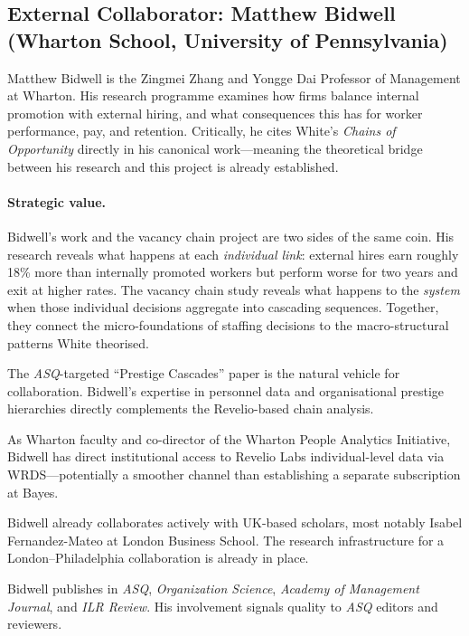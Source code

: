 \documentclass[a4paper]{tufte-handout}
\begin{document}
\subsection{External Collaborator: Matthew Bidwell (Wharton School, University of Pennsylvania)}


Matthew Bidwell is the Zingmei Zhang and Yongge Dai Professor of Management at Wharton.
His research programme examines how firms balance internal promotion with external hiring, and what consequences this has for worker performance, pay, and retention. Critically, he cites White's \emph{Chains of Opportunity} directly in his canonical work---meaning the theoretical bridge between his research and this project is already established.

\paragraph{Strategic value.}
Bidwell's work and the vacancy chain project are two sides of the same coin. His research reveals what happens at each \emph{individual link}: external hires earn roughly 18\% more than internally promoted workers but perform worse for two years and exit at higher rates. The vacancy chain study reveals what happens to the \emph{system} when those individual decisions aggregate into cascading sequences. Together, they connect the micro-foundations of staffing decisions to the macro-structural patterns White theorised.

\begin{description}[style=nextline, font=\normalfont\itshape]
  \item[Paper~2 co-author]
    The \emph{ASQ}-targeted ``Prestige Cascades'' paper is the natural vehicle for collaboration. Bidwell's expertise in personnel data and organisational prestige hierarchies directly complements the Revelio-based chain analysis.
  \item[Revelio/WRDS access]
    As Wharton faculty and co-director of the Wharton People Analytics Initiative, Bidwell has direct institutional access to Revelio Labs individual-level data via WRDS---potentially a smoother channel than establishing a separate subscription at Bayes.
  \item[Transatlantic infrastructure]
    Bidwell already collaborates actively with UK-based scholars, most notably Isabel Fernandez-Mateo at London Business School. The research infrastructure for a London--Philadelphia collaboration is already in place.
  \item[Publication track record]
    Bidwell publishes in \emph{ASQ}, \emph{Organization Science}, \emph{Academy of Management Journal}, and \emph{ILR Review}. His involvement signals quality to \emph{ASQ} editors and reviewers.
\end{description}
\end{document}
